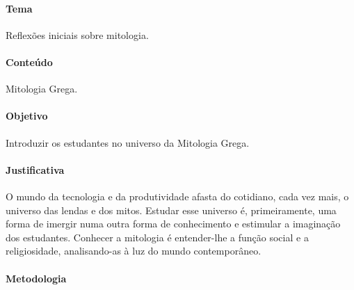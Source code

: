 \documentclass[11pt]{extarticle}
\begin{document}

\paragraph{Tema} Reflexões iniciais sobre mitologia. 

\paragraph{Conteúdo} Mitologia Grega.

\paragraph{Objetivo} Introduzir os estudantes no universo da Mitologia Grega. 

\paragraph{Justificativa} O mundo da tecnologia e da produtividade afasta do cotidiano, cada vez mais, o universo das lendas e dos mitos. Estudar esse universo é, primeiramente, uma forma de imergir numa outra forma de conhecimento e estimular a imaginação dos estudantes. Conhecer a mitologia é entender-lhe a função social e a religiosidade, analisando-as à luz do mundo contemporâneo.  

\paragraph{Metodologia}
\end{document}
